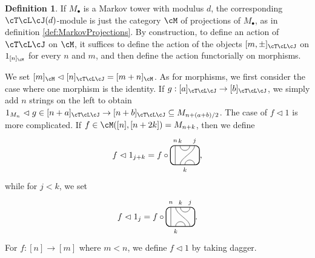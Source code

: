 \documentclass[11pt]{article}
\theoremstyle{plain}
\theoremstyle{definition}
\newtheorem{defn}[thm]{Definition}
\newcommand{\TLJ}{\cT\cL\cJ}
\newcommand{\TLPlusPIso}[3]{
	\TLTStart
	\TLTThrough{#1}
	\TLTSnakeR{#2}{#3}
	\TLTEnd
}
\newcommand{\TLMinusPIso}[3]{
	\TLTStart
	\TLTThrough{#1}
	\TLTSnakeL{#2}{#3}
	\TLTEnd
}
\newcommand{\TLTCalcLabelOffset}[3][0cm]{
	\settowidth{#2}{\scriptsize{$#3$}}
	\setlength{#2}{.5#2}
	\setlength{#2}{\maxof{#2}{#1}}
}
\newcommand{\TLTEnd}{
	\draw[thick, rounded corners = 5pt] (0,0) rectangle ($ (TLTlead) + (0,.8) $);
 \end{tikzpicture}
}
\newcommand{\TLTStart}{
 \begin{tikzpicture}[baseline=.3cm]
	\coordinate (TLTlead) at (.2,0); %
	\let\TLTlabelwidth\relax
	\newlength{\TLTlabelwidth}
}
\newcommand{\TLTThrough}[1]{
	\TLTCalcLabelOffset[.2cm]{\TLTlabelwidth}{#1}
	\coordinate (TLTlead) at ($ (TLTlead) + ({\TLTlabelwidth},0) $);
	\begin{scope}[shift=(TLTlead)]
		\draw (0,0) -- (0,.8);
		\node at (0,1) {\scriptsize{$#1$}};
	\end{scope}
		\coordinate (TLTlead) at ($ (TLTlead) + ({\TLTlabelwidth},0) $);
}
\newcommand{\TLTSnakeR}[2]{
	\let\TLTscwidth\relax
	\newlength{\TLTscwidth}
	\let\TLTsswidth\relax
	\newlength{\TLTsswidth}
	\TLTCalcLabelOffset[.2cm]{\TLTscwidth}{#1}
	\TLTCalcLabelOffset[.5cm]{\TLTsswidth}{#2}
	\setlength{\TLTlabelwidth}{\TLTscwidth+\TLTsswidth}
	\setlength{\TLTlabelwidth}{\maxof{\TLTlabelwidth}{.7cm}} %
	\coordinate (TLTlead) at ($ (TLTlead) + ({\TLTscwidth},0) $);
	\begin{scope}[shift=(TLTlead)]
		\draw (.1,.8) arc (-180:0:.2cm);
		\draw (.1,0) .. controls ++(90:.3cm) and ++(270:.3cm) .. ($ (.1,.8) + ({\TLTlabelwidth},0) $);
		\draw ($ (.1,0) + ({\TLTsswidth},0) $) arc (180:0:.2cm);
		\node at (.1,1) {\scriptsize{$#1$}};
		\node at ($ (.1,1) + ({\TLTlabelwidth},0) $) {\scriptsize{$#2$}};
		\node at ($ (.1,-.2) + ({\TLTsswidth},0) $) {\scriptsize{$#1$}};
	\end{scope}
	\coordinate (TLTlead) at ($ (TLTlead) + ({\TLTlabelwidth+\TLTsswidth},0) $);
}
\newcommand{\TLTSnakeL}[2]{
	\let\TLTscwidth\relax
	\newlength{\TLTscwidth}
	\let\TLTsswidth\relax
	\newlength{\TLTsswidth}
	\TLTCalcLabelOffset[.2cm]{\TLTscwidth}{#1}
	\TLTCalcLabelOffset[.1cm]{\TLTsswidth}{#2}
	\setlength{\TLTlabelwidth}{\TLTscwidth+\TLTsswidth}
	\setlength{\TLTlabelwidth}{\maxof{\TLTlabelwidth}{.5cm}} %
	\coordinate (TLTlead) at ($ (TLTlead) + ({\TLTsswidth},0) $);
	\begin{scope}[shift=(TLTlead)]
		\draw ($ (.1,.8) + ({\TLTsswidth+\TLTscwidth},0) $) arc (-180:0:.2cm);
		\draw ($ (.1,0) + ({\TLTlabelwidth},0) $) .. controls ++(90:.3cm) and ++(270:.3cm) .. (.1,.8);
		\draw (.1,0) arc (180:0:.2cm);
		\node at ($ (.1,1) + ({\TLTsswidth+\TLTscwidth},0) $) {\scriptsize{$#1$}};
		\node at (.1,1) {\scriptsize{$#2$}};
		\node at (.1,-.2) {\scriptsize{$#1$}};
	\end{scope}
	\setlength{\TLTscwidth}{\maxof{\TLTscwidth}{.5cm}} %
	\coordinate (TLTlead) at ($ (TLTlead) + ({\TLTlabelwidth+\TLTscwidth},0) $);
}
\begin{document}
\begin{defn}
\label{def:ModuleFromMarkovTower}
	If $M_\bullet$ is a Markov tower with modulus $d$, the corresponding $\cT\cL\cJ(d)$-module is just the category $\cM$ of projections of $M_\bullet$, as in definition \ref{def:MarkovProjections}. By construction, to define an action of $\TLJ$ on $\cM$, it suffices to define the action of the objects $[m,\pm]_{\cT\cL\cJ}$ on $1_{[n]_\cM}$ for every $n$ and $m$, and then define the action functorially on morphisms. 
	
We set $[m]_\cM\vartriangleleft [n]_{\TLJ}=[m+n]_\cM$. 
As for morphisms, we first consider the case where one morphism is the identity. 
	If $g:[a]_{\TLJ}\to[b]_{\TLJ}$, we simply add $n$ strings on the left to obtain $1_{M_n}\vartriangleleft g\in[n+a]_{\TLJ}\to[n+b]_{\TLJ}\subseteq M_{n+(a+b)/2}$. %
	The case of $f\vartriangleleft 1$ is more complicated. If $f\in \cM([n],[n+2k])=M_{n+k}$, then we define 
\[f\vartriangleleft 1_{j+k}=f\circ
	\begin{tikzpicture}[baseline=.3cm]
		\draw (.2,0) -- (.2,.8);
		\node at (.2,1) {\scriptsize{$n$}};
		\draw (.6,0) arc (180:0:.2cm);
		\node at (.6,-.2) {\scriptsize{$k$}};
		\draw (.4,0) .. controls ++(90:.3cm) and ++(270:.3cm) .. (1,.8);
		\node at (1,1) {\scriptsize{$j$}};
		\draw (.4,.8) arc (-180:0:.2cm);
		\node at (.4,1) {\scriptsize{$k$}};
		\draw[thick, rounded corners = 5pt] (0,0) rectangle (1.2,.8);
	\end{tikzpicture}
	\text{,}\]
while for $j<k$, we set 
\[f\vartriangleleft 1_j=f\circ
	\begin{tikzpicture}[baseline=.3cm]
		\draw (.2,0) -- (.2,.8);
		\node at (.2,1) {\scriptsize{$n$}};
		\draw (.4,0) arc (180:0:.2cm);
		\node at (.4,-.2) {\scriptsize{$k$}};
		\draw (1,0) .. controls ++(90:.3cm) and ++(270:.3cm) .. (.4,.8);
		\node at (1,1) {\scriptsize{$j$}};
		\draw (.6,.8) arc (-180:0:.2cm);
		\node at (.6,1) {\scriptsize{$k$}};
		\draw[thick, rounded corners = 5pt] (0,0) rectangle (1.2,.8);
	\end{tikzpicture}
	\text{.}\]
For $f:[n]\to[m]$ where $m<n$, we define $f\vartriangleleft 1$ by taking dagger. 


\end{defn}
\end{document}
